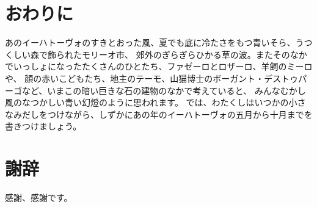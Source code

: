 \chapter{おわりに}
 あのイーハトーヴォのすきとおった風、夏でも底に冷たさをもつ青いそら、うつくしい森で飾られたモリーオ市、
 郊外のぎらぎらひかる草の波。またそのなかでいっしょになったたくさんのひとたち、ファゼーロとロザーロ、羊飼のミーロや、
 顔の赤いこどもたち、地主のテーモ、山猫博士のボーガント・デストゥパーゴなど、いまこの暗い巨きな石の建物のなかで考えていると、
 みんなむかし風のなつかしい青い幻燈のように思われます。
 では、わたくしはいつかの小さなみだしをつけながら、しずかにあの年のイーハトーヴォの五月から十月までを書きつけましょう。

\newpage

\chapter*{謝辞}
感謝、感謝です。
